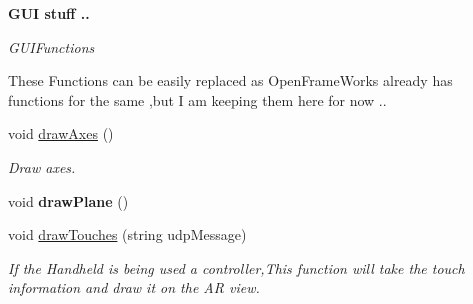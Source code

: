 \begin{Indent}{\bf G\-U\-I stuff ..}\par
{\em G\-U\-I\-Functions

These Functions can be easily replaced as Open\-Frame\-Works already has functions for the same ,but I am keeping them here for now .. }\begin{DoxyCompactItemize}
\item 
void \hyperlink{classtest_app_aa2fcbae31171ba366d4c0fcaf44149f4}{draw\-Axes} ()
\begin{DoxyCompactList}\small\item\em Draw axes. \end{DoxyCompactList}\item 
\hypertarget{classtest_app_a47747729f6d0d84c36ef0ec9fca01303}{void {\bfseries draw\-Plane} ()}\label{classtest_app_a47747729f6d0d84c36ef0ec9fca01303}

\item 
void \hyperlink{classtest_app_a16036c3aa23c1747e315a3e18105cf45}{draw\-Touches} (string udp\-Message)
\begin{DoxyCompactList}\small\item\em If the Handheld is being used a controller,This function will take the touch information and draw it on the A\-R view. \end{DoxyCompactList}\end{DoxyCompactItemize}
\end{Indent}
